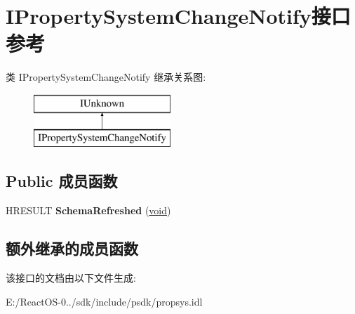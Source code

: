 \hypertarget{interface_i_property_system_change_notify}{}\section{I\+Property\+System\+Change\+Notify接口 参考}
\label{interface_i_property_system_change_notify}
类 I\+Property\+System\+Change\+Notify 继承关系图\+:\begin{figure}[H]
\begin{center}
\leavevmode
\includegraphics[height=2.000000cm]{interface_i_property_system_change_notify}
\end{center}
\end{figure}
\subsection*{Public 成员函数}
\begin{DoxyCompactItemize}
\item 
\mbox{\label{interface_i_property_system_change_notify_a56be5bd7e22f5320eca5928044caba5a}} 
H\+R\+E\+S\+U\+LT {\bfseries Schema\+Refreshed} (\hyperlink{interfacevoid}{void})
\end{DoxyCompactItemize}
\subsection*{额外继承的成员函数}


该接口的文档由以下文件生成\+:\begin{DoxyCompactItemize}
\item 
E\+:/\+React\+O\+S-\/0../sdk/include/psdk/propsys.\+idl\end{DoxyCompactItemize}
